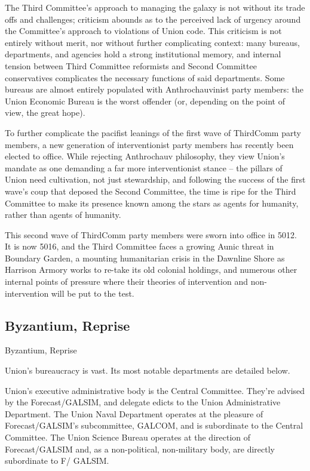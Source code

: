 The Third Committee’s approach to managing the galaxy is not without its trade offs and
challenges; criticism abounds as to the perceived lack of urgency around the Committee’s
approach to violations of Union code. This criticism is not entirely without merit, nor without further
complicating context: many bureaus, departments, and agencies hold a strong institutional
memory, and internal tension between Third Committee reformists and Second Committee
conservatives complicates the necessary functions of said departments. Some bureaus are
almost entirely populated with Anthrochauvinist party members: the Union Economic Bureau is
the worst offender (or, depending on the point of view, the great hope).

To further complicate the pacifist leanings of the first wave of ThirdComm party members, a new
generation of interventionist party members has recently been elected to office. While rejecting
Anthrochauv philosophy, they view Union’s mandate as one demanding a far more interventionist
stance -- the pillars of Union need cultivation, not just stewardship, and following the success of
the first wave’s coup that deposed the Second Committee, the time is ripe for the Third
Committee to make its presence known among the stars as agents for humanity, rather than
agents of humanity.

This second wave of ThirdComm party members were sworn into office in 5012. It is now 5016,
and the Third Committee faces a growing Aunic threat in Boundary Garden, a mounting
humanitarian crisis in the Dawnline Shore as Harrison Armory works to re-take its old colonial
holdings, and numerous other internal points of pressure where their theories of intervention and
non-intervention will be put to the test.



\subsection{Byzantium, Reprise }


Byzantium, Reprise

Union’s bureaucracy is vast. Its most notable departments are detailed below.


Union’s executive administrative body is the Central Committee. They’re advised by the
Forecast/GALSIM, and delegate edicts to the Union Administrative Department. The Union Naval
Department operates at the pleasure of Forecast/GALSIM’s subcommittee, GALCOM, and is
subordinate to the Central Committee. The Union Science Bureau operates at the direction of
Forecast/GALSIM and, as a non-political, non-military body, are directly subordinate to F/
GALSIM.


